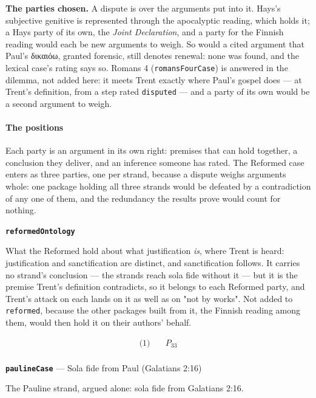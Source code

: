 \documentclass[11pt]{article}
\begin{document}
\textbf{The parties chosen.} A dispute is over the arguments put into it. Hays's subjective genitive is represented through the apocalyptic reading, which holds it; a Hays party of its own, the \emph{Joint Declaration}, and a party for the Finnish reading would each be new arguments to weigh. So would a cited argument that Paul's δικαιόω, granted forensic, still denotes renewal: none was found, and the lexical case's rating says so. Romans 4 (\texttt{romans\allowbreak{}Four\allowbreak{}Case}) is answered in the dilemma, not added here: it meets Trent exactly where Paul's gospel does — at Trent's definition, from a step rated \texttt{disputed} — and a party of its own would be a second argument to weigh.

\paragraph*{The positions}
\leavevmode\par
Each party is an argument in its own right: premises that can hold together, a conclusion they deliver, and an inference someone has rated. The Reformed case enters as three parties, one per strand, because a dispute weighs arguments whole: one package holding all three strands would be defeated by a contradiction of any one of them, and the redundancy the results prove would count for nothing.

\par\medskip\noindent\textbf{\texttt{reformed\allowbreak{}Ontology}}\par\nobreak\noindent
What the Reformed hold about what justification \emph{is}, where Trent is heard: justification and sanctification are distinct, and sanctification follows. It carries no strand's conclusion — the strands reach sola fide without it — but it is the premise Trent's definition contradicts, so it belongs to each Reformed party, and Trent's attack on each lands on it as well as on "not by works". Not added to \texttt{reformed}, because the other packages built from it, the Finnish reading among them, would then hold it on their authors' behalf.

\begin{align*}
  \text{(1)} \quad & P_{33} \\
\end{align*}
\par\medskip\noindent\textbf{\texttt{pauline\allowbreak{}Case}} --- Sola fide from Paul (Galatians 2:16)\par\nobreak\noindent
The Pauline strand, argued alone: sola fide from Galatians 2:16.
\end{document}
